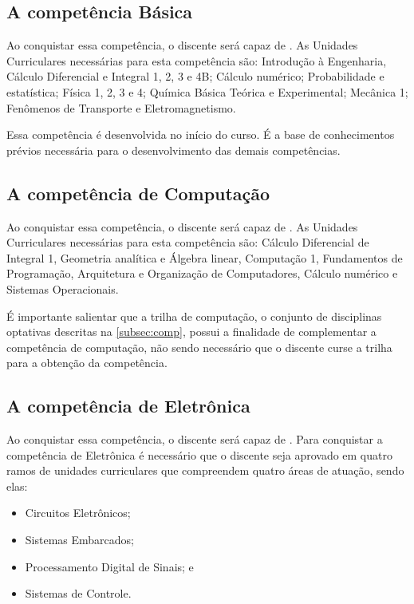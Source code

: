 \subsection{A competência Básica}

Ao conquistar essa competência, o discente será capaz de \textbf{\compBasica}. As Unidades Curriculares necessárias para esta competência são: Introdução à Engenharia, Cálculo Diferencial e Integral 1, 2, 3 e 4B; Cálculo numérico; Probabilidade e estatística; Física 1, 2, 3 e 4; Química Básica Teórica e Experimental; Mecânica 1; Fenômenos de Transporte e Eletromagnetismo.

Essa competência é desenvolvida no início do curso. É a base de conhecimentos prévios necessária para o desenvolvimento das demais competências.

\subsection{A competência de Computação}

Ao conquistar essa competência, o discente será capaz de \textbf{\compComp}. As Unidades Curriculares necessárias para esta competência são: Cálculo Diferencial de Integral 1, Geometria analítica e Álgebra linear, Computação 1, Fundamentos de Programação, Arquitetura e Organização de Computadores, Cálculo numérico e Sistemas Operacionais.

É importante salientar que a trilha de computação, o conjunto de disciplinas optativas descritas na \autoref{subsec:comp}, possui a finalidade de complementar a competência de computação, não sendo necessário que o discente curse a trilha para a obtenção da competência.

\subsection{A competência de Eletrônica}

Ao conquistar essa competência, o discente será capaz de \textbf{\compTron}. Para conquistar a competência de Eletrônica é necessário que o discente seja aprovado em quatro ramos de unidades curriculares que compreendem quatro áreas de atuação, sendo elas:

\begin{itemize}
    \item Circuitos Eletrônicos;
    \item Sistemas Embarcados;
    \item Processamento Digital de Sinais; e
    \item Sistemas de Controle.
\end{itemize}

